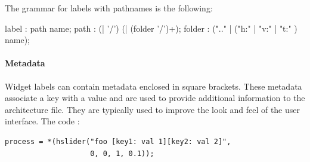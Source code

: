 The grammar for labels with pathnames is the following:

\begin{rail}
 label : path name;
 path : (| '/') (| (folder '/')+);
 folder : (".." | ("h:" | "v:" | "t:" ) name);
\end{rail}

\paragraph{Metadata}
Widget labels can contain metadata enclosed in square brackets. These metadata associate a key with a value and are used to provide additional information to the architecture file.  They are typically used to improve the look and feel of the user interface. 
The \faust code :
\begin{lstlisting}
process = *(hslider("foo [key1: val 1][key2: val 2]", 
					0, 0, 1, 0.1));
\end{lstlisting}

